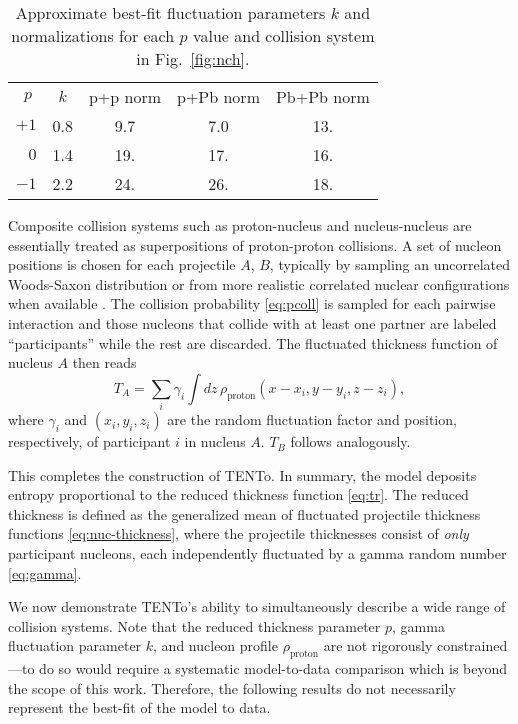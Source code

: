\documentclass[aps,prc,reprint,amsmath,nofootinbib]{revtex4-1}
\newcommand{\psec}[1]{\phantomsection\addcontentsline{toc}{section}{#1}}
\newcommand{\trento}{T\raisebox{-.5ex}{R}ENTo}
\begin{document}
\begin{table}
  \caption{
    \label{tab:nch}
    Approximate best-fit fluctuation parameters $k$ and normalizations for each $p$ value and collision system in Fig.~\ref{fig:nch}.
  }
  \begin{ruledtabular}
  \begin{tabular}{rcccc}
    $p\;$  & $k$ & p+p norm & p+Pb norm & Pb+Pb norm \\
    $+1$   & 0.8 & 9.7      & 7.0       & 13.        \\
    $ 0$   & 1.4 & 19.      & 17.       & 16.        \\
    $-1$   & 2.2 & 24.      & 26.       & 18.        \\
  \end{tabular}
  \end{ruledtabular}
\end{table}

Composite collision systems such as proton-nucleus and nucleus-nucleus are essentially treated as
superpositions of proton-proton collisions.
A set of nucleon positions is chosen for each projectile $A$, $B$, typically by sampling an uncorrelated Woods-Saxon distribution or from more realistic correlated nuclear configurations when available \cite{Alvioli:2009ab}.
The collision probability \eqref{eq:pcoll} is sampled for each pairwise interaction and those nucleons that collide with at least one partner are labeled ``participants'' while the rest are discarded.
The fluctuated thickness function of nucleus $A$ then reads
\begin{equation}
  T_A = \sum_i \gamma_i \int dz \, \rho_\text{proton}(x - x_i, y - y_i, z - z_i),
  \label{eq:nuc-thickness}
\end{equation}
where $\gamma_i$ and $(x_i, y_i, z_i)$ are the random fluctuation factor and position, respectively, of participant $i$ in nucleus $A$.
$T_B$ follows analogously.

This completes the construction of \trento.
In summary, the model deposits entropy proportional to the reduced thickness function \eqref{eq:tr}.
The reduced thickness is defined as the generalized mean of fluctuated projectile thickness functions \eqref{eq:nuc-thickness}, where the projectile thicknesses consist of \emph{only} participant nucleons, each independently fluctuated by a gamma random number \eqref{eq:gamma}.

\psec{Applications}

We now demonstrate \trento's ability to simultaneously describe a wide range of collision systems.
Note that the reduced thickness parameter $p$, gamma fluctuation parameter $k$, and nucleon profile $\rho_\text{proton}$ are not rigorously constrained---to do so would require a systematic model-to-data comparison \cite{Bernhard:2015hxa} which is beyond the scope of this work.
Therefore, the following results do not necessarily represent the best-fit of the model to data.
\end{document}
